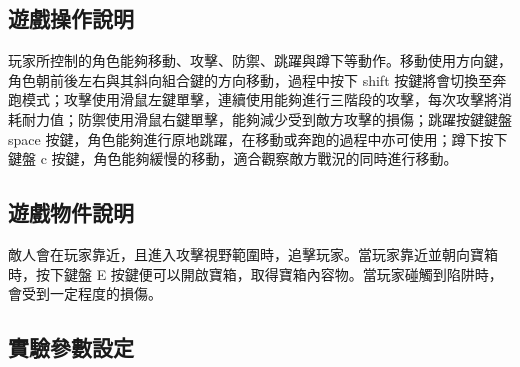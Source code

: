 \subsection{遊戲操作說明}
\label{ssec:experiment-gameplaymanual}

玩家所控制的角色能夠移動、攻擊、防禦、跳躍與蹲下等動作。移動使用方向鍵，角色朝前後左右與其斜向組合鍵的方向移動，過程中按下 shift 按鍵將會切換至奔跑模式；攻擊使用滑鼠左鍵單擊，連續使用能夠進行三階段的攻擊，每次攻擊將消耗耐力值；防禦使用滑鼠右鍵單擊，能夠減少受到敵方攻擊的損傷；跳躍按鍵鍵盤 space 按鍵，角色能夠進行原地跳躍，在移動或奔跑的過程中亦可使用；蹲下按下鍵盤 c 按鍵，角色能夠緩慢的移動，適合觀察敵方戰況的同時進行移動。

\subsection{遊戲物件說明}
\label{ssec:experiment-gameobjects}

敵人會在玩家靠近，且進入攻擊視野範圍時，追擊玩家。當玩家靠近並朝向寶箱時，按下鍵盤 E 按鍵便可以開啟寶箱，取得寶箱內容物。當玩家碰觸到陷阱時，會受到一定程度的損傷。







\subsection{實驗參數設定}
\label{ssec:experiment-parameters}


